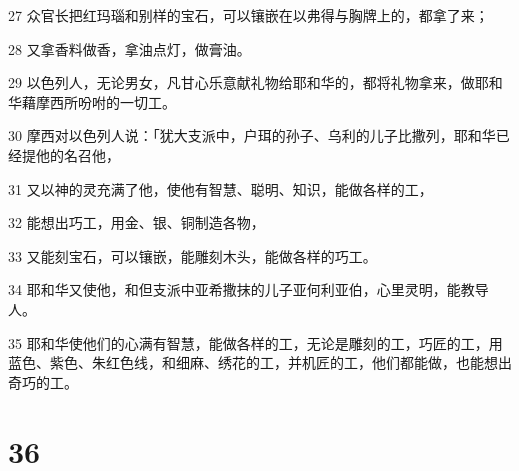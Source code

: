 \par 27 众官长把红玛瑙和别样的宝石，可以镶嵌在以弗得与胸牌上的，都拿了来；
\par 28 又拿香料做香，拿油点灯，做膏油。
\par 29 以色列人，无论男女，凡甘心乐意献礼物给耶和华的，都将礼物拿来，做耶和华藉摩西所吩咐的一切工。
\par 30 摩西对以色列人说：「犹大支派中，户珥的孙子、乌利的儿子比撒列，耶和华已经提他的名召他，
\par 31 又以神的灵充满了他，使他有智慧、聪明、知识，能做各样的工，
\par 32 能想出巧工，用金、银、铜制造各物，
\par 33 又能刻宝石，可以镶嵌，能雕刻木头，能做各样的巧工。
\par 34 耶和华又使他，和但支派中亚希撒抹的儿子亚何利亚伯，心里灵明，能教导人。
\par 35 耶和华使他们的心满有智慧，能做各样的工，无论是雕刻的工，巧匠的工，用蓝色、紫色、朱红色线，和细麻、绣花的工，并机匠的工，他们都能做，也能想出奇巧的工。

\chapter{36}

